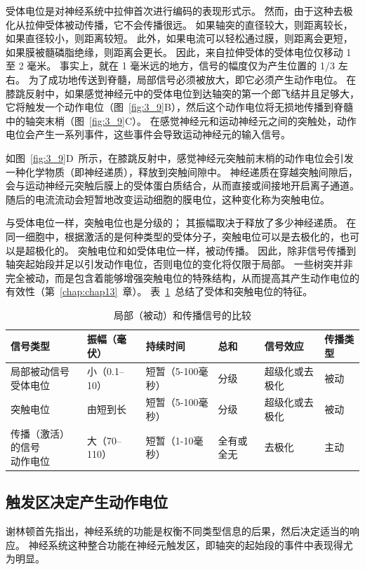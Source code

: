 受体电位是对神经系统中拉伸首次进行编码的表现形式示。
然而，由于这种去极化从拉伸受体被动传播，它不会传播很远。
如果轴突的直径较大，则距离较长，如果直径较小，则距离较短。
此外，如果电流可以轻松通过膜，则距离会更短，如果膜被髓磷脂绝缘，则距离会更长。
因此，来自拉伸受体的受体电位仅移动 1 至 2 毫米。
事实上，就在 1 毫米远的地方，信号的幅度仅为产生位置的 1/3 左右。
为了成功地传送到脊髓，局部信号必须被放大，即它必须产生动作电位。
在膝跳反射中，如果感觉神经元中的受体电位到达轴突的第一个郎飞结并且足够大，它将触发一个动作电位（图~\ref{fig:3_9}B），然后这个动作电位将无损地传播到脊髓中的轴突末梢（图~\ref{fig:3_9}C）。
在感觉神经元和运动神经元之间的突触处，动作电位会产生一系列事件，这些事件会导致运动神经元的输入信号。


如图~\ref{fig:3_9}D~所示，在膝跳反射中，感觉神经元突触前末梢的动作电位会引发一种化学物质（即神经递质），释放到突触间隙中。
神经递质在穿越突触间隙后，会与运动神经元突触后膜上的受体蛋白质结合，从而直接或间接地开启离子通道。
随后的电流流动会短暂地改变运动细胞的膜电位，这种变化称为突触电位。


与受体电位一样，突触电位也是分级的； 
其振幅取决于释放了多少神经递质。 
在同一细胞中，根据激活的是何种类型的受体分子，突触电位可以是去极化的，也可以是超极化的。 
突触电位和如受体电位一样，被动传播。 
因此，除非信号传播到轴突起始段并足以引发动作电位，否则电位的变化将仅限于局部。
一些树突并非完全被动，而是包含着能够增强突触电位的特殊结构，从而提高其产生动作电位的有效性（第~\ref{chap:chap13}~章）。 
表~\ref{tab:3_1}~总结了受体和突触电位的特征。


\begin{table}[htbp]
	\caption{局部（被动）和传播信号的比较} \label{tab:3_1} \centering
	\begin{tabular}{llllll}
		\toprule
		信号类型 & 振幅（毫伏） & 持续时间 & 总和 & 信号效应 & 传播类型\\
		\midrule
		\makecell{局部被动信号\\受体电位} & 小（0.1–10） & 短暂（5-100毫秒） & 分级 & 超级化或去极化 & 被动 \\
		\midrule
		突触电位 & 由短到长 & 短暂（5-100毫秒） & 分级 & 超级化或去极化 & 被动 \\
		\makecell{传播（激活）的信号\\动作电位} & 大（70–110） & 短暂（1-10毫秒） & 全有或全无 & 
		去极化 & 主动 \\
		\bottomrule
	\end{tabular}
\end{table}


\subsection{触发区决定产生动作电位}
谢林顿首先指出，神经系统的功能是权衡不同类型信息的后果，然后决定适当的响应。 
神经系统这种整合功能在神经元触发区，即轴突的起始段的事件中表现得尤为明显。



